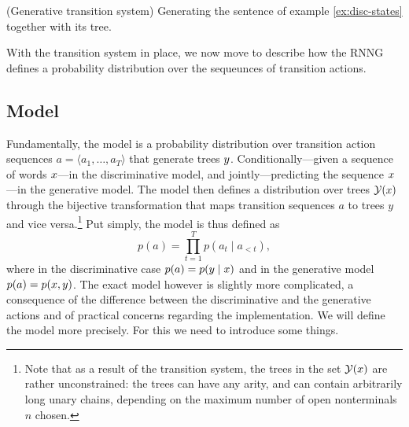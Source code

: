     \begin{example}{(Generative transition system)} Generating the sentence of example \ref{ex:disc-states} together with its tree.
      
    \end{example}

    With the transition system in place, we now move to describe how the RNNG defines a probability distribution over the sequeunces of transition actions.

  \subsection{Model}
    Fundamentally, the model is a probability distribution over transition action sequences $a = \langle a_1, \dots, a_T \rangle$ that generate trees $y$.  Conditionally---given a sequence of words $x$---in the discriminative model, and jointly---predicting the sequence $x$---in the generative model. The model then defines a distribution over trees $\mathcal{Y}(x)$ through the bijective transformation that maps transition sequences $a$ to trees $y$ and vice versa.\footnote{ Note that as a result of the transition system, the trees in the set $\mathcal{Y}(x)$ are rather unconstrained: the trees can have any arity, and can contain arbitrarily long unary chains, depending on the maximum number of open nonterminals $n$ chosen.} Put simply, the model is thus defined as
    \begin{equation}
      \label{eq:naive-rnng-model}
      p( a ) = \prod_{t=1}^T p( a_t \mid a_{<t} ),
    \end{equation}
    where in the discriminative case $p( a ) = p( y \mid x )$ and in the generative model $p( a ) = p( x, y )$. The exact model however is slightly more complicated, a consequence of the difference between the discriminative and the generative actions and of practical concerns regarding the implementation. We will define the model more precisely. For this we need to introduce some things.

